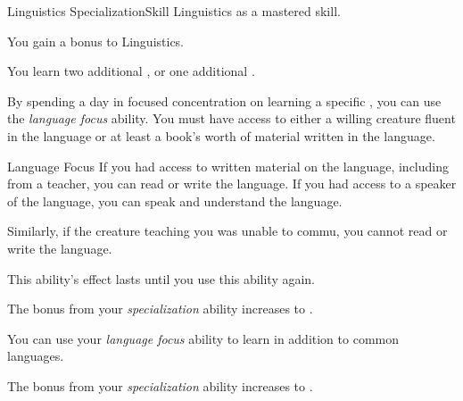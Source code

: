     \begin{feat}{Linguistics Specialization}{Skill}
        \featpre Linguistics as a mastered skill.

         You gain a  bonus to Linguistics.

         You learn two additional , or one additional .

         By spending a day in focused concentration on learning a specific , you can use the \textit{language focus} ability.
        You must have access to either a willing creature fluent in the language or at least a book's worth of material written in the language.
        \begin{freeability}{Language Focus}
            If you had access to written material on the language, including from a teacher, you can read or write the language.
            If you had access to a speaker of the language, you can speak and understand the language.

            Similarly, if the creature teaching you was unable to commu, you cannot read or write the language.

            This ability's effect lasts until you use this ability again.
        \end{freeability}

         The bonus from your \textit{specialization} ability increases to .

         You can use your \textit{language focus} ability to learn  in addition to common languages.

         The bonus from your \textit{specialization} ability increases to .
    \end{feat}

